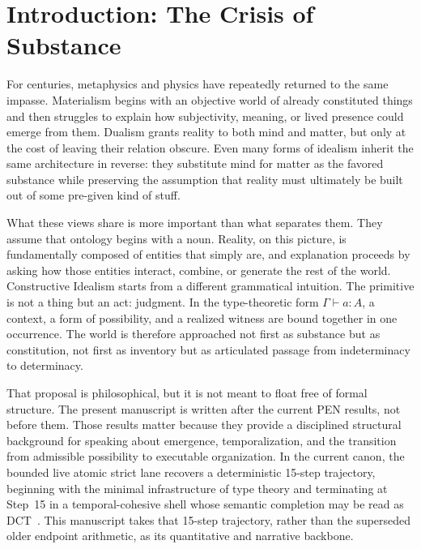 \documentclass[11pt,a4paper]{article}
\theoremstyle{plain}
\theoremstyle{definition}
\theoremstyle{remark}
\begin{document}
\section{Introduction: The Crisis of Substance}
\label{sec:introduction}

For centuries, metaphysics and physics have repeatedly returned to the same impasse.
Materialism begins with an objective world of already constituted things and then struggles to explain how subjectivity, meaning, or lived presence could emerge from them.
Dualism grants reality to both mind and matter, but only at the cost of leaving their relation obscure.
Even many forms of idealism inherit the same architecture in reverse: they substitute mind for matter as the favored substance while preserving the assumption that reality must ultimately be built out of some pre-given kind of stuff.

What these views share is more important than what separates them.
They assume that ontology begins with a noun.
Reality, on this picture, is fundamentally composed of entities that simply are, and explanation proceeds by asking how those entities interact, combine, or generate the rest of the world.
Constructive Idealism starts from a different grammatical intuition.
The primitive is not a thing but an act: judgment.
In the type-theoretic form $\Gamma \vdash a : A$, a context, a form of possibility, and a realized witness are bound together in one occurrence.
The world is therefore approached not first as substance but as constitution, not first as inventory but as articulated passage from indeterminacy to determinacy.

That proposal is philosophical, but it is not meant to float free of formal structure.
The present manuscript is written after the current PEN results, not before them.
Those results matter because they provide a disciplined structural background for speaking about emergence, temporalization, and the transition from admissible possibility to executable organization.
In the current canon, the bounded live atomic strict lane recovers a deterministic 15-step trajectory, beginning with the minimal infrastructure of type theory and terminating at Step~15 in a temporal-cohesive shell whose semantic completion may be read as DCT~\cite{pen}.
This manuscript takes that 15-step trajectory, rather than the superseded older endpoint arithmetic, as its quantitative and narrative backbone.
\end{document}
